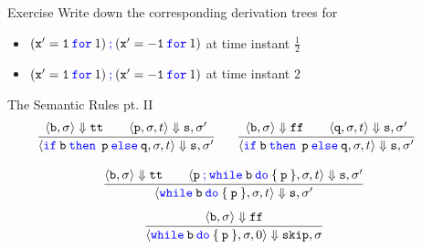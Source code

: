\documentclass{beamer}
\newcommand{\blue}[1]{\textcolor{blue}{#1}}
\begin{document}
\begin{frame}{Exercise}
        Write down the corresponding derivation trees for
        \begin{itemize}
                \item $(\mathtt{x' = 1} \> \mathtt{\blue{for}} \> 1) \>
                        \blue{\mathtt{;}} \> (\mathtt{x' = -1} \> \mathtt{\blue{for}} \> 1)$
                        at time instant $\frac{1}{2}$
                \item $(\mathtt{x' = 1} \> \mathtt{\blue{for}} \> 1) \>
                        \blue{\mathtt{;}} \> (\mathtt{x' = -1} \> \mathtt{\blue{for}} \> 1)$ 
                        at time instant $2$
        \end{itemize}
\end{frame} 
\begin{frame}{The Semantic Rules pt. II}
        \[\hspace{-0.4cm}
                \infer[]{
                        \langle \mathtt{\blue{if} \> b \> \blue{then} \> \> p \> \blue{else} \> q}, 
                        \sigma, t \rangle \Downarrow \mathtt{s}, \sigma'
                }{
                        \langle \mathtt{b}, \sigma \rangle \Downarrow \mathtt{tt} \qquad
                        \langle \mathtt{p}, \sigma, t \rangle \Downarrow \mathtt{s}, \sigma'
                } \hspace{0.5cm} 
                \infer[]{
                        \langle \mathtt{\blue{if} \> b \> \blue{then} \> \> p \> \blue{else} \> q}, 
                        \sigma, t \rangle \Downarrow \mathtt{s}, \sigma'
                }{
                        \langle \mathtt{b}, \sigma \rangle \Downarrow \mathtt{ff} \qquad
                        \langle \mathtt{q}, \sigma, t \rangle \Downarrow \mathtt{s}, \sigma'
                } 
        \]

        \[
                \infer[]{
                        \langle \mathtt{\blue{while} \> b \> \blue{do} \> \{ \> p \> \}}, 
                        \sigma, t \rangle \Downarrow \mathtt{s}, \sigma'
                }{
                        \langle \mathtt{b}, \sigma \rangle \Downarrow \mathtt{tt} \qquad
                        \langle \mathtt{\mathtt{p} \> \blue{\mathtt{;}} \> 
                        \blue{while} \> b \> \blue{do} \> \{ \> p \> \}}, \sigma, t
                        \rangle \Downarrow \mathtt{s}, \sigma' 
                }
        \]\vspace{0.001cm}
        \[
                \infer[]{
                        \langle \mathtt{\blue{while} \> b \> \blue{do} \> \{ \> p \> \}}, \sigma 
                        , 0 \rangle \Downarrow \mathtt{skip},\sigma
                }{
                        \langle \mathtt{b}, \sigma \rangle\Downarrow  \mathtt{ff}
                }
        \]
\end{frame}
\end{document}
